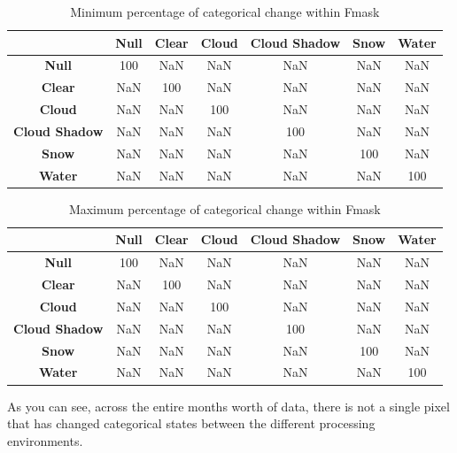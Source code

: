 \documentclass[a4paper]{article}
\begin{document}
    \begin{table}[ht!]
      \caption{Minimum percentage of categorical change within Fmask}\label{table:5}
      \centering
      \begin{tabular}{ccccccc} \midrule
        & \textbf{Null} & \textbf{Clear} & \textbf{Cloud} & \textbf{Cloud Shadow} & \textbf{Snow} & \textbf{Water} \\ \midrule
        \textbf{Null} & 100 & NaN & NaN & NaN & NaN & NaN \\
        \textbf{Clear} & NaN & 100 & NaN & NaN & NaN & NaN \\
        \textbf{Cloud} & NaN & NaN & 100 & NaN & NaN & NaN \\
        \textbf{Cloud Shadow} & NaN & NaN & NaN & 100 & NaN & NaN \\
        \textbf{Snow} & NaN & NaN & NaN & NaN & 100 & NaN \\
        \textbf{Water} & NaN & NaN & NaN & NaN & NaN & 100 \\
      \end{tabular}
    \end{table}

    \begin{table}[ht!]
      \caption{Maximum percentage of categorical change within Fmask}\label{table:6}
      \centering
      \begin{tabular}{ccccccc} \midrule
        & \textbf{Null} & \textbf{Clear} & \textbf{Cloud} & \textbf{Cloud Shadow} & \textbf{Snow} & \textbf{Water} \\ \midrule
        \textbf{Null} & 100 & NaN & NaN & NaN & NaN & NaN \\
        \textbf{Clear} & NaN & 100 & NaN & NaN & NaN & NaN \\
        \textbf{Cloud} & NaN & NaN & 100 & NaN & NaN & NaN \\
        \textbf{Cloud Shadow} & NaN & NaN & NaN & 100 & NaN & NaN \\
        \textbf{Snow} & NaN & NaN & NaN & NaN & 100 & NaN \\
        \textbf{Water} & NaN & NaN & NaN & NaN & NaN & 100 \\
      \end{tabular}
    \end{table}

      \begin{flushleft}
        As you can see, across the entire months worth of data, there is not a single pixel that has changed categorical states between the different processing environments.
      \end{flushleft}
\end{document}
